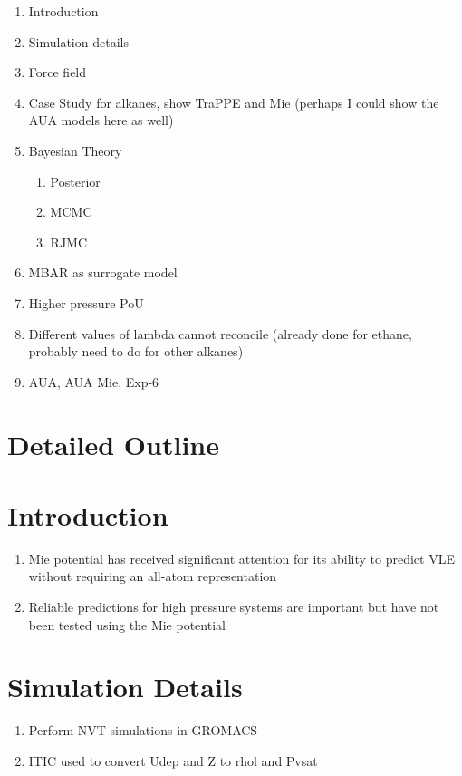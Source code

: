 \documentclass[preprint,letterpaper,floatfix,citeautoscript,aip,jcp]{revtex4-1}
\begin{document}
\begin{enumerate}
	\item Introduction
	\item Simulation details
	\item Force field
	\item Case Study for alkanes, show TraPPE and Mie (perhaps I could show the AUA models here as well)
	\item Bayesian Theory
	\begin{enumerate}
		\item Posterior
		\item MCMC
		\item RJMC
	\end{enumerate}
	\item MBAR as surrogate model
	\item Higher pressure PoU
	\item Different values of lambda cannot reconcile (already done for ethane, probably need to do for other alkanes)
	\item AUA, AUA Mie, Exp-6	
\end{enumerate}

\section*{Detailed Outline}

\section{Introduction}

\begin{enumerate}
	\item Mie potential has received significant attention for its ability to predict VLE without requiring an all-atom representation
	\item Reliable predictions for high pressure systems are important but have not been tested using the Mie potential
\end{enumerate}

\section{Simulation Details}

\begin{enumerate}
	\item Perform NVT simulations in GROMACS
	\item ITIC used to convert Udep and Z to rhol and Pvsat
\end{enumerate}
\end{document}
